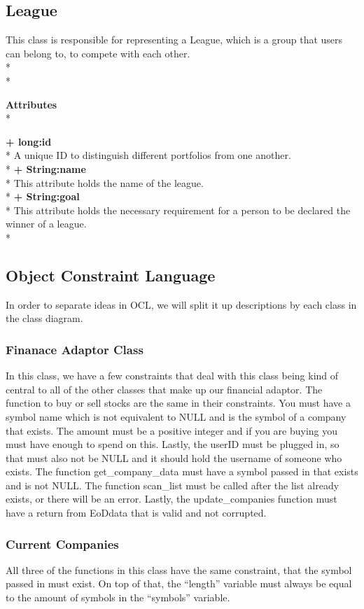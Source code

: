 \subsection{League}
This class is responsible for representing a League, which is a group that
users can belong to, to compete with each other.\\* \\*

{\bfseries Attributes} \\*

{\bfseries + long:id} \\*
A unique ID to distinguish different portfolios from one another.\\*
{\bfseries + String:name} \\*
This attribute holds the name of the league.\\*
{\bfseries + String:goal} \\*
This attribute holds the necessary requirement for a person to be declared the
winner of a league. \\*



\iffalse


\subsection{Object Constraint Language}
In order to separate ideas in OCL, we will split it up descriptions by each class in the class diagram.
\subsubsection{Finanace Adaptor Class}
In this class, we have a few constraints that deal with this class being kind of central to all of the other classes that make up our financial adaptor. The function to buy or sell stocks are the same in their constraints. You must have a symbol name which is not equivalent to NULL and is the symbol of a company that exists. The amount must be a positive integer and if you are buying you must have enough to spend on this. Lastly, the userID must be plugged in, so that must also not be NULL and it should hold the username of someone who exists. The function get\_company\_data must have a symbol passed in that exists and is not NULL. The function scan\_list must be called after the list already exists, or there will be an error. Lastly, the update\_companies function must have a return from EoDdata that is valid and not corrupted.
\subsubsection{Current Companies}
All three of the functions in this class have the same constraint, that the symbol passed in must exist. On top of that, the ``length'' variable must always be equal to the amount of symbols in the ``symbols'' variable.
